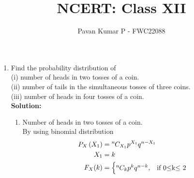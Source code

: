 \documentclass{article}
\providecommand{\brak}[1]{\ensuremath{\left(#1\right)}}
\newcommand{\solution}{\noindent \textbf{Solution: }}
\newcommand*{\permcomb}[4][0mu]{{{}^{#3}\mkern#1#2_{#4}}}
\newcommand*{\comb}[1][-1mu]{\permcomb[#1]{C}}
\begin{document}
\title{NCERT: Class XII}
\author{\Large Pavan Kumar P - FWC22088}
\date{}

\maketitle

\begin{enumerate}[label=13.\arabic{enumi}.\arabic{enumii}]

\setcounter{enumi}{3}
\setcounter{enumii}{4}

\item Find the probability distribution of\\
(i) number of heads in two tosses of a coin.\\
(ii) number of tails in the simultaneous tosses of three coins.\\
(iii) number of heads in four tosses of a coin.\\[1ex]
\solution
\begin{enumerate} 

\begin{table}[h]
 \centering
	
	\caption{Variable Description }
\end{table}
\item Number of heads in two tosses of a coin.\\
 By using binomial distribution
 \begin{align}
P_X\brak{X_1} &= \comb{n}{X_1}p^{X_1}q^{n-X_1}\\
X_1 &= k\\
  F_X(k) &=
    \begin{cases}
      \comb{n}{k}p^{k}q^{n-k}, & \text{if  0$\leq$k$\leq$ 2}\\
    \end{cases}             
\end{align}


\end{enumerate}
\end{enumerate}
\end{document}
